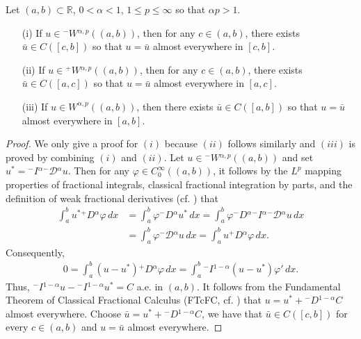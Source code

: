 \documentclass[leqno,final]{siamltex}
\numberwithin{equation}{section}
\renewcommand{\(}{\bigl(}
\renewcommand{\)}{\bigr)}
\newcommand{\R}{\mathbb{R}}
\begin{document}
    \begin{proposition}\label{ContinuousRepresentative}
        Let $(a,b)\subset \R$, $0< \alpha <1$, $1 \leq p \leq \infty$ so that $\alpha p > 1$.
        \begin{itemize}
            \item[(i)] If $u \in {^{-}}{W}{^{\alpha,p}}((a,b))$, then for any $c \in (a,b)$, there exists $\bar{u} \in C([c,b])$ so that $u = \bar{u}$ almost everywhere in $[c,b]$. 
            \item[(ii)] If $u \in {^{+}}{W}{^{\alpha,p}}((a,b))$, then for any $c \in (a,b)$, there exists $\bar{u} \in C([a,c])$ so that $u = \bar{u}$ almost everywhere in $[a,c]$.
            \item[(iii)] If $u \in W^{\alpha,p}((a,b))$, then there exists $\bar{u} \in C([a,b])$ so that $u = \bar{u}$ almost everywhere in $[a,b]$. 
        \end{itemize}
    \end{proposition}
    
    \begin{proof}
        We only give a proof for $(i)$ because $(ii)$ follows similarly and $(iii)$ is proved by combining $(i)$ and $(ii)$. Let $u \in {^{-}}{W}{^{\alpha,p}}((a,b))$ and set $u^* = {^{-}}{I}{^{\alpha}} {^{-}}{\mathcal{D}}{^{\alpha}} u$. Then for any $\varphi \in C^{\infty}_{0}((a,b))$, it follows by the $L^{p}$ mapping properties of fractional integrals, classical fractional integration by parts, and the definition of weak fractional derivatives (cf. \cite[Theorem 2.5 and 2.6]{Feng_Sutton}) that  
        \begin{align*}
            \int_{a}^{b} u^* {^{+}}{D}{^{\alpha}} \varphi\, dx &= \int_{a}^{b} \varphi  {^{-}}{D}{^{\alpha}} u^* \, dx
            = \int_{a}^{b} \varphi  {^{-}}{D}{^{\alpha}} {^{-}}{I}{^{\alpha}} {^{-}}{\mathcal{D}}{^{\alpha}} u  \, dx \\
            &= \int_{a}^{b}  \varphi {^{-}}{\mathcal{D}}{^{\alpha}} u \, dx
            = \int_{a}^{b} u {^{+}}{D}{^{\alpha}} \varphi \, dx.
        \end{align*}
        Consequently,
        \begin{align*}
            0 = \int_{a}^{b} (u - u^*) {^{+}}{D}{^{\alpha}} \varphi\, dx = \int_{a}^{b} {^{-}}{I}{^{1-\alpha}}(u - u^*) \varphi'\, dx.
        \end{align*}
        Thus, ${^{-}}{I}{^{1-\alpha}}u - {^{-}}{I}{^{1-\alpha}} u^* = C$ a.e. in $(a,b)$. It follows  from the Fundamental Theorem of Classical Fractional Calculus (FTcFC, cf. \cite[Lemma 3.1]{Feng_Sutton}) that 
        $u = u^* + {^{-}}{D}{^{1-\alpha}} C$ almost everywhere. Choose $\bar{u} = u^* + {^{-}}{D}{^{1-\alpha}} C$, we have that $\bar{u} \in C([c,b])$ for every $c \in(a,b)$ and $u = \bar{u}$ almost everywhere. 
    \end{proof}
    
\end{document}
